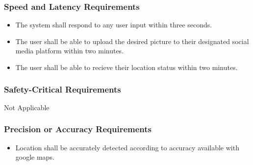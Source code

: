 \documentclass[]{article}
\begin{document}
\subsubsection{Speed and Latency Requirements}
\label{ssub:speed_and_latency_requirements}
\begin{itemize}
	\item The system shall respond to any user input within three seconds.
	\item The user shall be able to upload the desired picture to their designated social media platform within two minutes.
	\item The user shall be able to recieve their location status within two minutes.
\end{itemize}

\subsubsection{Safety-Critical Requirements}
\label{ssub:safety_critical_requirements}
Not Applicable

\subsubsection{Precision or Accuracy Requirements}
\label{ssub:precision_or_accuracy_requirements}
\begin{itemize}
	\item Location shall be accurately detected according to accuracy available with google maps.
\end{itemize}
\end{document}
